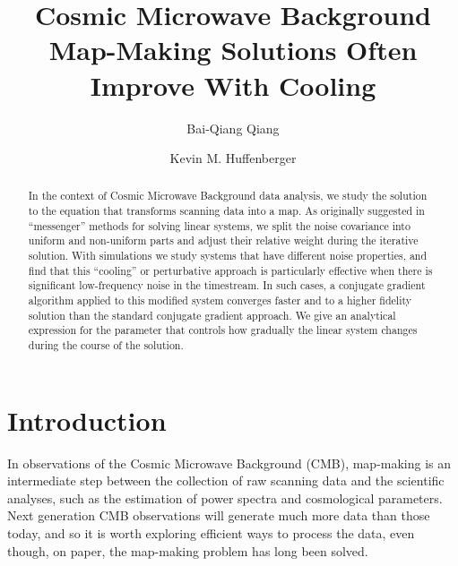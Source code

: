 \documentclass[twocolumn,linenumbers]{aastex631}
\begin{document}
\title{Cosmic Microwave Background Map-Making Solutions Often Improve With Cooling}


  \author{Bai-Qiang Qiang} 

\author[0000-0001-7109-0099]{Kevin M. Huffenberger}

 
\begin{abstract}

In the context of Cosmic Microwave Background data analysis, we study the solution to the equation that transforms scanning data into a map.
As originally suggested in ``messenger'' methods for solving linear systems, we split the  noise covariance into uniform and non-uniform parts and adjust their relative weight during the iterative solution.
With simulations we study systems that have different noise properties, and find that this ``cooling'' or perturbative approach is particularly effective when there is significant low-frequency noise in the timestream.  In such cases, a conjugate gradient algorithm applied to this modified system converges faster and to a higher fidelity solution than the standard conjugate gradient approach. %
We give an analytical expression for the parameter that controls how gradually the linear system changes during the course of the solution.

\end{abstract}


\section{Introduction} \label{sec:intro}


In observations of the Cosmic Microwave Background (CMB), map-making is an intermediate step between the collection of raw scanning data and the scientific analyses, such as the estimation of power spectra and cosmological parameters.
Next generation CMB observations will generate much more data than those today, and so
it is worth exploring efficient ways to process the data, even though, on paper, the map-making problem has long been solved.
\end{document}
